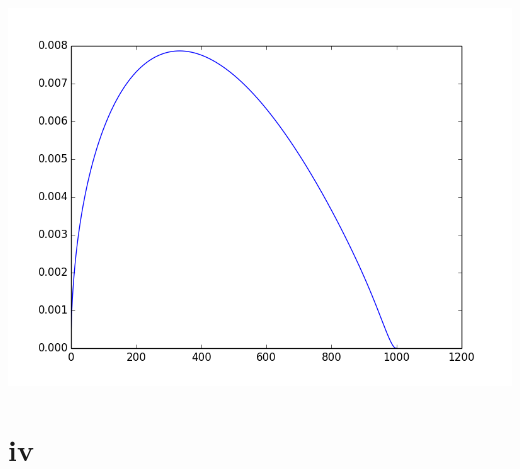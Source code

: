 \documentclass[a4paper,norsk]{article}
\begin{document}
\includegraphics[trim = 0mm 0mm 0mm 0mm, clip, scale=0.3]{nu_t.png} 



\section*{iv}
\end{document}
